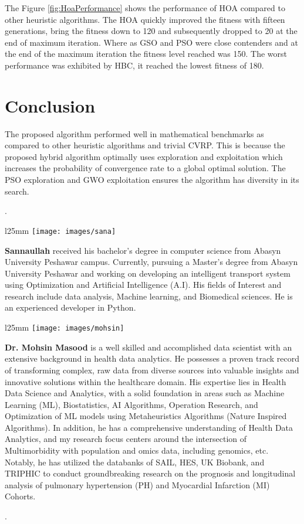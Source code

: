 \documentclass[conference]{IEEEtran}
\begin{document}
\begin{abstract1}
 The Figure \ref{fig:HoaPerformance} shows the performance of HOA compared to other heuristic algorithms. The HOA quickly improved the fitness with fifteen generations, bring the fitness down to 120 and subsequently dropped to 20 at the end of maximum iteration. Where as GSO and PSO were close contenders and at the end of the maximum iteration the fitness level reached was 150. The worst performance was exhibited by HBC, it reached the lowest fitness of 180.  
  
 
  \section{Conclusion}
  The proposed algorithm performed well in mathematical benchmarks as compared to other heuristic algorithms and trivial CVRP. This is because the proposed hybrid algorithm optimally uses exploration and exploitation which increases the probability of convergence rate to a global optimal solution. The PSO exploration and GWO exploitation ensures the algorithm has diversity in its search.
 



\par.

 \begin{wrapfigure}{l}{25mm} 
	\texttt{[image: images/sana]}
\end{wrapfigure}\par
\textbf{Sannaullah}  received his bachelor's degree in computer science from Abasyn University Peshawar campus. Currently, pursuing a Master’s degree from Abasyn University Peshawar and working on developing an intelligent transport system using Optimization and Artificial Intelligence (A.I). His fields of Interest and research include data analysis, Machine learning, and Biomedical sciences. He is an experienced developer in Python. 


 \begin{wrapfigure}{l}{25mm} 
	\texttt{[image: images/mohsin]}
\end{wrapfigure}\par
\textbf{Dr. Mohsin Masood}   is a well skilled and accomplished data scientist with an extensive background in health data analytics. He possesses a proven track record of transforming complex, raw data from diverse sources into valuable insights and innovative solutions within the healthcare domain. His expertise lies in Health Data Science and Analytics, with a solid foundation in areas such as Machine Learning (ML), Biostatistics, AI Algorithms, Operation Research, and Optimization of ML models using Metaheuristics Algorithms (Nature Inspired Algorithms). In addition, he has a comprehensive understanding of Health Data Analytics, and my research focus centers around the intersection of Multimorbidity with population and omics data, including genomics, etc. Notably, he has utilized the databanks of SAIL, HES, UK Biobank, and TRIPHIC to conduct groundbreaking research on the prognosis and longitudinal analysis of pulmonary hypertension (PH) and Myocardial Infarction (MI) Cohorts.
\par.


\end{abstract1}
\end{document}
